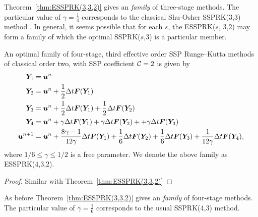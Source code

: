 Theorem~\ref{thm:ESSPRK(3,3,2)} gives an \emph{family} of three-stage methods.
The particular value of $\gamma = \frac{1}{4}$ corresponds to the
classical Shu-Osher SSPRK(3,3) method .  
In general, it seems possible that for each $s$, the ESSPRK($s$, $3$,$2$) may form a family of which the optimal SSPRK($s$,$3$) is a particular member. 

\begin{theorem}\label{thm:ESSPRK(4,3,2)}
  An optimal family of four-stage, third effective order
  SSP Runge--Kutta methods of classical order two, with SSP
  coefficient $\mathcal{C}=2$ is given by
    \begin{displaymath}
        \begin{split}
            \bm{Y}_{1} &= \bm{u}^{n} \\
            \bm{Y}_{2} &= \bm{u}^{n} + \frac{1}{2}\Delta t\bm{F}(\bm{Y}_{1}) \\
            \bm{Y}_{3} &= \bm{u}^{n} + \frac{1}{2}\Delta t\bm{F}(\bm{Y}_{1}) + \frac{1}{2}\Delta t\bm{F}(\bm{Y}_{2}) \\
            \bm{Y}_{4} &= \bm{u}^{n} + \gamma\Delta t\bm{F}(\bm{Y}_{1}) + \gamma\Delta t\bm{F}(\bm{Y}_{2}) + + \gamma\Delta t\bm{F}(\bm{Y}_{3}) \\
            \bm{u}^{n+1} &= \bm{u}^{n} + \frac{8\gamma-1}{12\gamma}\Delta t\bm{F}(\bm{Y}_{1}) + \frac{1}{6}\Delta t\bm{F}(\bm{Y}_{2}) + \frac{1}{6}\Delta t\bm{F}(\bm{Y}_{3}) + \frac{1}{12\gamma}\Delta t\bm{F}(\bm{Y}_{4}),
        \end{split}
    \end{displaymath}
    where $ 1/6 \leq \gamma \leq 1/2 $ is a free parameter. We denote the above family as ESSPRK($4$,$3$,$2$).
\end{theorem}
\begin{proof}
	Similar with Theorem~\ref{thm:ESSPRK(3,3,2)}
\end{proof}

As before Theorem~\ref{thm:ESSPRK(3,3,2)} gives an \emph{family} of four-stage methods.
The particular value of $\gamma = \frac{1}{6}$ corresponds to the usual SSPRK($4$,$3$) method.


